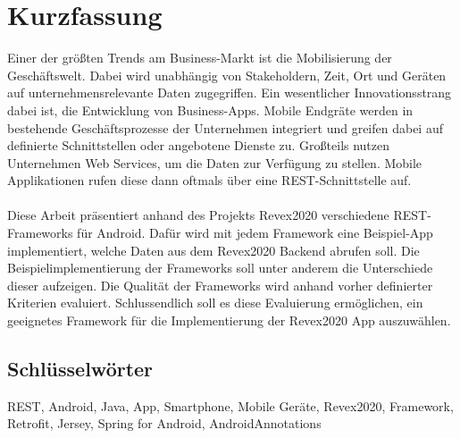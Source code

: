 
\cleardoublepage
{}


\chapter*{Kurzfassung}
Einer der größten Trends am Business-Markt ist die Mobilisierung der Geschäftswelt. Dabei wird unabhängig von Stakeholdern, Zeit, Ort und Geräten auf unternehmensrelevante Daten zugegriffen. Ein wesentlicher Innovationsstrang dabei ist, die Entwicklung von Business-Apps. Mobile Endgräte werden in bestehende Geschäftsprozesse der Unternehmen integriert und greifen dabei auf definierte Schnittstellen oder angebotene Dienste zu. Großteils nutzen Unternehmen Web Services, um die Daten zur Verfügung zu stellen. Mobile Applikationen rufen diese dann oftmals über eine REST-Schnittstelle auf.
\\\\
Diese Arbeit präsentiert anhand des Projekts Revex2020 verschiedene REST-Frameworks für Android. Dafür wird mit jedem Framework eine Beispiel-App implementiert, welche Daten aus dem Revex2020 Backend abrufen soll. Die Beispielimplementierung der Frameworks soll unter anderem die Unterschiede dieser aufzeigen. Die Qualität der Frameworks wird anhand vorher definierter Kriterien evaluiert. Schlussendlich soll es diese Evaluierung ermöglichen, ein geeignetes Framework für die Implementierung der Revex2020 App auszuwählen.

\section*{Schl\"usselw\"orter}
REST, Android, Java, App, Smartphone, Mobile Geräte, Revex2020, Framework, Retrofit, Jersey, Spring for Android, AndroidAnnotations


